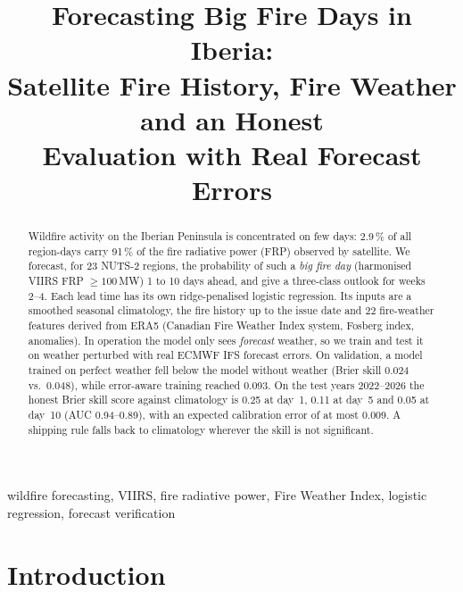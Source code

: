 \documentclass[conference,a4paper]{IEEEtran}
\begin{document}
\title{Forecasting Big Fire Days in Iberia:\\ Satellite Fire History, Fire Weather and an Honest\\ Evaluation with Real Forecast Errors}

\author{
}

\maketitle

\begin{abstract}
Wildfire activity on the Iberian Peninsula is concentrated on few days: 2.9\,\% of all region-days carry 91\,\% of the
fire radiative power (FRP) observed by satellite. We forecast, for 23 NUTS-2 regions, the probability of such a
\emph{big fire day} (harmonised VIIRS FRP $\geq 100$\,MW) 1 to 10 days ahead, and give a three-class outlook for
weeks 2--4. Each lead time has its own ridge-penalised logistic regression. Its inputs are a smoothed seasonal
climatology, the fire history up to the issue date and 22 fire-weather features derived from ERA5 (Canadian Fire
Weather Index system, Fosberg index, anomalies). In operation the model only sees \emph{forecast} weather, so we train
and test it on weather perturbed with real ECMWF IFS forecast errors. On validation, a model trained on perfect weather
fell below the model without weather (Brier skill 0.024 vs.\ 0.048), while error-aware training reached 0.093. On the
test years 2022--2026 the honest Brier skill score against climatology is 0.25 at day~1, 0.11 at day~5 and 0.05 at
day~10 (AUC 0.94--0.89), with an expected calibration error of at most 0.009. A shipping rule falls back to
climatology wherever the skill is not significant.
\end{abstract}

\begin{IEEEkeywords}
wildfire forecasting, VIIRS, fire radiative power, Fire Weather Index, logistic regression, forecast verification
\end{IEEEkeywords}

\section{Introduction}
\end{document}
